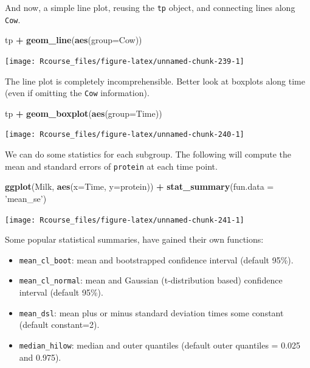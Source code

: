 \documentclass[]{book}
\newenvironment{Shaded}{\begin{snugshade}}{\end{snugshade}}
\newcommand{\KeywordTok}[1]{\textcolor[rgb]{0.13,0.29,0.53}{\textbf{#1}}}
\newcommand{\DataTypeTok}[1]{\textcolor[rgb]{0.13,0.29,0.53}{#1}}
\newcommand{\StringTok}[1]{\textcolor[rgb]{0.31,0.60,0.02}{#1}}
\newcommand{\OperatorTok}[1]{\textcolor[rgb]{0.81,0.36,0.00}{\textbf{#1}}}
\newcommand{\NormalTok}[1]{#1}
\providecommand{\tightlist}{%
  \setlength{\itemsep}{0pt}\setlength{\parskip}{0pt}}
\theoremstyle{definition}
\theoremstyle{definition}
\theoremstyle{definition}
\theoremstyle{remark}
\begin{document}
And now, a simple line plot, reusing the \texttt{tp} object, and
connecting lines along \texttt{Cow}.

\begin{Shaded}
\begin{Highlighting}[]
\NormalTok{tp }\OperatorTok{+}\StringTok{ }\KeywordTok{geom_line}\NormalTok{(}\KeywordTok{aes}\NormalTok{(}\DataTypeTok{group=}\NormalTok{Cow))}
\end{Highlighting}
\end{Shaded}

\texttt{[image: Rcourse\_files/figure-latex/unnamed-chunk-239-1]}

The line plot is completely incomprehensible. Better look at boxplots
along time (even if omitting the \texttt{Cow} information).

\begin{Shaded}
\begin{Highlighting}[]
\NormalTok{tp }\OperatorTok{+}\StringTok{ }\KeywordTok{geom_boxplot}\NormalTok{(}\KeywordTok{aes}\NormalTok{(}\DataTypeTok{group=}\NormalTok{Time))}
\end{Highlighting}
\end{Shaded}

\texttt{[image: Rcourse\_files/figure-latex/unnamed-chunk-240-1]}

We can do some statistics for each subgroup. The following will compute
the mean and standard errors of \texttt{protein} at each time point.

\begin{Shaded}
\begin{Highlighting}[]
\KeywordTok{ggplot}\NormalTok{(Milk, }\KeywordTok{aes}\NormalTok{(}\DataTypeTok{x=}\NormalTok{Time, }\DataTypeTok{y=}\NormalTok{protein)) }\OperatorTok{+}
\StringTok{  }\KeywordTok{stat_summary}\NormalTok{(}\DataTypeTok{fun.data =} \StringTok{'mean_se'}\NormalTok{)}
\end{Highlighting}
\end{Shaded}

\texttt{[image: Rcourse\_files/figure-latex/unnamed-chunk-241-1]}

Some popular statistical summaries, have gained their own functions:

\begin{itemize}
\tightlist
\item
  \texttt{mean\_cl\_boot}: mean and bootstrapped confidence interval
  (default 95\%).
\item
  \texttt{mean\_cl\_normal}: mean and Gaussian (t-distribution based)
  confidence interval (default 95\%).
\item
  \texttt{mean\_dsl}: mean plus or minus standard deviation times some
  constant (default constant=2).
\item
  \texttt{median\_hilow}: median and outer quantiles (default outer
  quantiles = 0.025 and 0.975).
\end{itemize}
\end{document}
